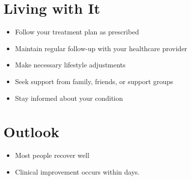 \section{Living with It}
\begin{itemize}[noitemsep]
  \item Follow your treatment plan as prescribed
  \item Maintain regular follow-up with your healthcare provider
  \item Make necessary lifestyle adjustments
  \item Seek support from family, friends, or support groups
  \item Stay informed about your condition
\end{itemize}
\section{Outlook}
\begin{itemize}[noitemsep]
  \item Most people recover well
  \item Clinical improvement occurs within days.
\end{itemize}
